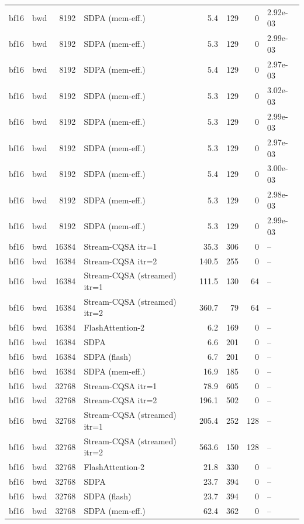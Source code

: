 \begin{tabular}{llrlrrrl}
bf16 & bwd & 8192 & SDPA (mem-eff.) & 5.4 & 129 & 0 & 2.92e-03 \\
bf16 & bwd & 8192 & SDPA (mem-eff.) & 5.3 & 129 & 0 & 2.99e-03 \\
bf16 & bwd & 8192 & SDPA (mem-eff.) & 5.4 & 129 & 0 & 2.97e-03 \\
bf16 & bwd & 8192 & SDPA (mem-eff.) & 5.3 & 129 & 0 & 3.02e-03 \\
bf16 & bwd & 8192 & SDPA (mem-eff.) & 5.3 & 129 & 0 & 2.99e-03 \\
bf16 & bwd & 8192 & SDPA (mem-eff.) & 5.3 & 129 & 0 & 2.97e-03 \\
bf16 & bwd & 8192 & SDPA (mem-eff.) & 5.4 & 129 & 0 & 3.00e-03 \\
bf16 & bwd & 8192 & SDPA (mem-eff.) & 5.3 & 129 & 0 & 2.98e-03 \\
bf16 & bwd & 8192 & SDPA (mem-eff.) & 5.3 & 129 & 0 & 2.99e-03 \\
bf16 & bwd & 16384 & Stream-CQSA itr=1 & 35.3 & 306 & 0 & -- \\
bf16 & bwd & 16384 & Stream-CQSA itr=2 & 140.5 & 255 & 0 & -- \\
bf16 & bwd & 16384 & Stream-CQSA (streamed) itr=1 & 111.5 & 130 & 64 & -- \\
bf16 & bwd & 16384 & Stream-CQSA (streamed) itr=2 & 360.7 & 79 & 64 & -- \\
bf16 & bwd & 16384 & FlashAttention-2 & 6.2 & 169 & 0 & -- \\
bf16 & bwd & 16384 & SDPA & 6.6 & 201 & 0 & -- \\
bf16 & bwd & 16384 & SDPA (flash) & 6.7 & 201 & 0 & -- \\
bf16 & bwd & 16384 & SDPA (mem-eff.) & 16.9 & 185 & 0 & -- \\
bf16 & bwd & 32768 & Stream-CQSA itr=1 & 78.9 & 605 & 0 & -- \\
bf16 & bwd & 32768 & Stream-CQSA itr=2 & 196.1 & 502 & 0 & -- \\
bf16 & bwd & 32768 & Stream-CQSA (streamed) itr=1 & 205.4 & 252 & 128 & -- \\
bf16 & bwd & 32768 & Stream-CQSA (streamed) itr=2 & 563.6 & 150 & 128 & -- \\
bf16 & bwd & 32768 & FlashAttention-2 & 21.8 & 330 & 0 & -- \\
bf16 & bwd & 32768 & SDPA & 23.7 & 394 & 0 & -- \\
bf16 & bwd & 32768 & SDPA (flash) & 23.7 & 394 & 0 & -- \\
bf16 & bwd & 32768 & SDPA (mem-eff.) & 62.4 & 362 & 0 & -- \\

\end{tabular}
